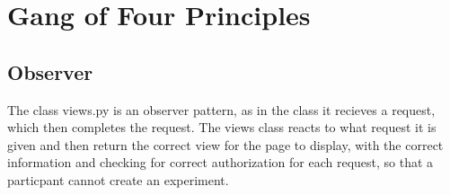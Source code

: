 \section{Gang of Four Principles}
\subsection{Observer}
The class views.py is an observer pattern, as in the class it recieves a request, which then completes the request.  The views class reacts to what request it is given and then return the correct view for the page to display, with the correct information and checking for correct authorization for each request, so that a particpant cannot create an experiment.